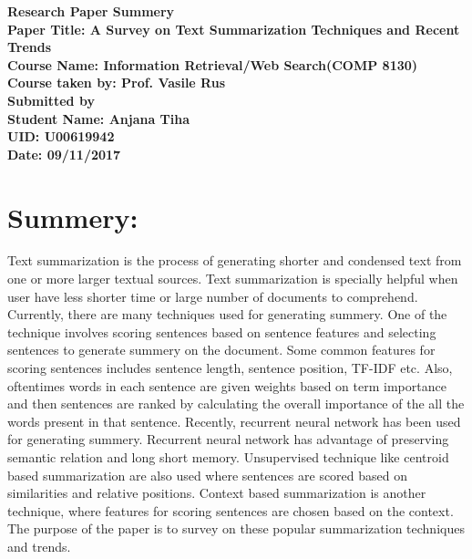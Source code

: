 \documentclass[12pt]{article}
\begin{document}
	\begin{titlepage}
		
		\begin{center}
			\begin{large}
			\vspace*{11em}
			\textbf{
			Research Paper Summery\\
			\vspace{2em}
			Paper Title: A Survey on Text Summarization Techniques and Recent Trends \\
			\vspace{2em}
			Course Name: Information Retrieval/Web Search(COMP 8130)\\
			\vspace{0.5em}
			Course taken by: Prof. Vasile Rus\\
			\vspace{2em}
			Submitted by\\
			\vspace{1em}
			Student Name: Anjana Tiha\\
			UID: U00619942\\
			Date: 09/11/2017\\
			}
			\end{large}

		\end{center}
		
	\end{titlepage}
	\newpage
	
	
\section*{Summery: }
Text summarization is the process of generating shorter and condensed text from one or more larger textual sources. Text summarization is specially helpful when user have less shorter time or large number of documents to comprehend. Currently, there are many techniques used for generating summery. One of the technique involves scoring sentences based on sentence features and selecting sentences to generate summery on the document. Some common features for scoring sentences includes sentence length, sentence position, TF-IDF etc. Also, oftentimes words in each sentence are given weights based on term importance and then sentences are ranked by calculating the overall importance of the all the words present in that sentence. Recently, recurrent neural network has been used for generating summery. Recurrent neural network has advantage of preserving semantic relation and long short memory. Unsupervised technique like centroid based summarization are also used where sentences are scored based on similarities and relative positions. Context based summarization is another technique, where features for scoring sentences are chosen based on the context. The purpose of the paper is to survey on these popular summarization techniques and trends.
\end{document}
